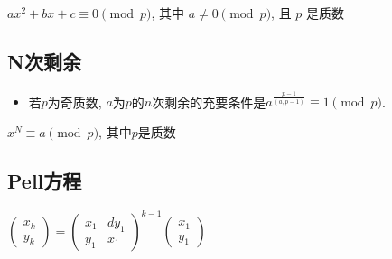 \documentclass[landscape, twocolumn, 8pt, a4paper, twoside]{extarticle}
\begin{document}
$ax^2 + bx + c \equiv 0 \pmod{p}$, 其中 $a \ne 0 \pmod{p}$, 且 $p$ 是质数


\subsection{N次剩余}
\begin{itemize}
\item 若$p$为奇质数, $a$为$p$的$n$次剩余的充要条件是$a^{\frac{p - 1}{(a, p - 1)}} \equiv 1 \pmod{p}$.
\end{itemize}
$x^N \equiv a \pmod{p}$, 其中$p$是质数


\subsection{Pell方程}
$\begin{pmatrix}
  x_k \\ y_k
\end{pmatrix} = 
\begin{pmatrix}
  x_1 & dy_1 \\
  y_1 & x_1
\end{pmatrix} ^ {k - 1}
\begin{pmatrix}
  x_1 \\ y_1
\end{pmatrix}
$


\end{document}
